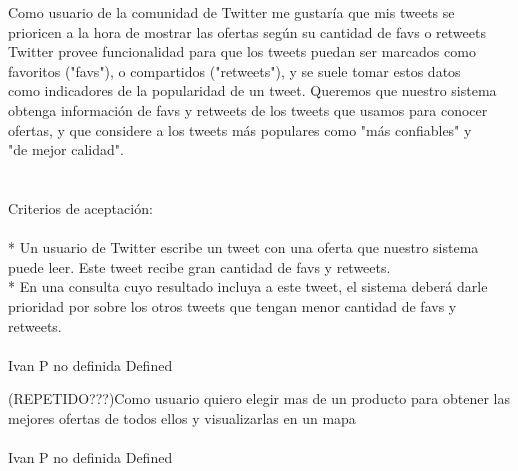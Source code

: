 	{Como usuario de la comunidad de Twitter me gustaría que mis tweets se prioricen a la hora de mostrar las ofertas según su cantidad de favs o retweets} %
	{Twitter provee funcionalidad para que los tweets puedan ser marcados como\\
favoritos ("favs"), o compartidos ("retweets"), y se suele tomar estos datos\\
como indicadores de la popularidad de un tweet. Queremos que nuestro sistema\\
obtenga información de favs y retweets de los tweets que usamos para conocer\\
ofertas, y que considere a los tweets más populares como "más confiables" y\\
"de mejor calidad".\\
\\
  \\
Criterios de aceptación:\\
\\
* Un usuario de Twitter escribe un tweet con una oferta que nuestro sistema puede leer. Este tweet recibe gran cantidad de favs y retweets.  \\
* En una consulta cuyo resultado incluya a este tweet, el sistema deberá darle prioridad por sobre los otros tweets que tengan menor cantidad de favs y retweets.\\
\\
} %
	{} %
	{} %
	{Ivan P} %
	{no definida} %
	{Defined} %


\vspace{20pt}

	{(REPETIDO???)Como usuario quiero elegir mas de un producto para obtener las mejores ofertas de todos ellos y visualizarlas en un mapa} %
	{\\
\\
} %
	{} %
	{} %
	{Ivan P} %
	{no definida} %
	{Defined} %


\vspace{20pt}

